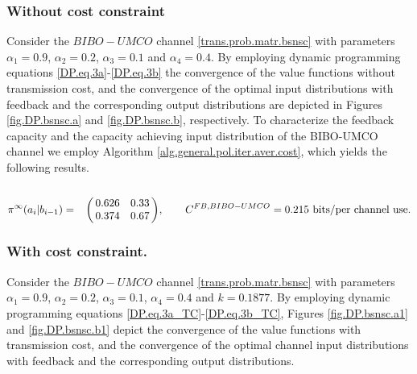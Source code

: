 \documentclass[11pt, a4paper, journal,onecolumn]{IEEEtran}
\let\bbordermatrix\bordermatrix
\begin{document}
\subsubsection{Without cost constraint} \label{subsec.ex.cost.constrnt} Consider the $BIBO-UMCO$ channel \eqref{trans.prob.matr.bsnsc} with parameters $\alpha_1=0.9$, $\alpha_2=0.2$, $\alpha_3=0.1$ and $\alpha_4=0.4$. By employing dynamic programming equations \eqref{DP.eq.3a}-\eqref{DP.eq.3b} the convergence of the value functions without transmission cost, and the convergence of the optimal input distributions with feedback and the corresponding output distributions are depicted in Figures \ref{fig.DP.bsnsc.a} and \ref{fig.DP.bsnsc.b}, respectively. To characterize the feedback capacity and the capacity achieving input distribution of  the BIBO-UMCO channel we employ Algorithm \ref{alg.general.pol.iter.aver.cost}, which yields the following results.
\begin{equation*}
{\pi}^{\infty}(a_i|b_{i-1}) = \bbordermatrix{~ \cr
                  & 0.626 & 0.33 \cr
                  & 0.374 & 0.67 \cr}, \qquad C^{FB,BIBO-UMCO}=0.215 \ \text{bits/per channel use.}
\end{equation*}








%
%
%


\subsubsection{With cost constraint.} Consider the $BIBO-UMCO$ channel \eqref{trans.prob.matr.bsnsc} with parameters $\alpha_1=0.9$, $\alpha_2=0.2$, $\alpha_3=0.1$, $\alpha_4=0.4$ and  $k=0.1877$. By employing dynamic programming equations \eqref{DP.eq.3a_TC}-\eqref{DP.eq.3b_TC}, Figures \ref{fig.DP.bsnsc.a1} and \ref{fig.DP.bsnsc.b1} depict the convergence of the value functions with transmission cost, and the convergence of the optimal channel input distributions with feedback and the corresponding output distributions.
\end{document}
